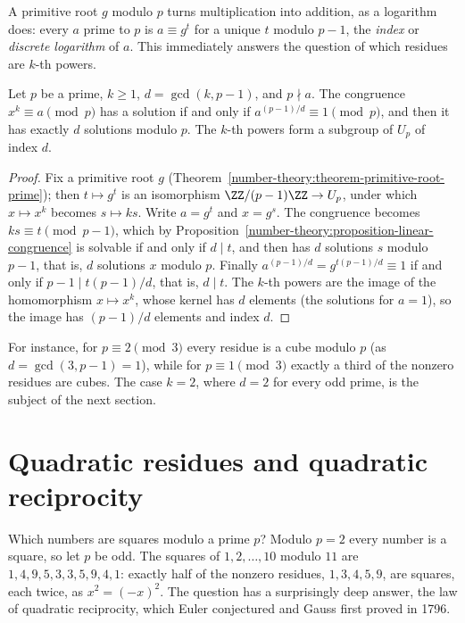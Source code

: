 A primitive root $g$ modulo $p$ turns multiplication into addition, as a logarithm does: every $a$ prime to $p$ is $a \equiv g^t$ for a unique $t$ modulo $p - 1$, the \emph{index} or \emph{discrete
logarithm} of $a$. This immediately answers the question of which residues are $k$-th powers.

\begin{proposition}\label{number-theory:proposition-power-residues}
Let $p$ be a prime, $k \geq 1$, $d = \gcd(k, p - 1)$, and $p \nmid a$. The congruence $x^k \equiv a \pmod p$ has a solution if and only if $a^{(p-1)/d} \equiv 1 \pmod p$, and then it has exactly $d$ solutions
modulo $p$. The $k$-th powers form a subgroup of $U_p$ of index $d$.
\end{proposition}

\begin{proof}
Fix a primitive root $g$ (Theorem~\ref{number-theory:theorem-primitive-root-prime}); then $t \mapsto g^t$ is an isomorphism $\ZZ/(p - 1)\ZZ \to U_p$, under which $x \mapsto x^k$ becomes
$s \mapsto ks$. Write $a = g^t$ and $x = g^s$. The congruence becomes $ks \equiv t \pmod{p - 1}$, which by Proposition~\ref{number-theory:proposition-linear-congruence} is solvable if and only if $d \mid t$,
and then has $d$ solutions $s$ modulo $p - 1$, that is, $d$ solutions $x$ modulo $p$. Finally $a^{(p-1)/d} = g^{t(p-1)/d} \equiv 1$ if and only if $p - 1 \mid t(p - 1)/d$, that is, $d \mid t$. The $k$-th
powers are the image of the homomorphism $x \mapsto x^k$, whose kernel has $d$ elements (the solutions for $a = 1$), so the image has $(p - 1)/d$ elements and index $d$.
\end{proof}

For instance, for $p \equiv 2 \pmod 3$ every residue is a cube modulo $p$ (as $d = \gcd(3, p - 1) = 1$), while for $p \equiv 1 \pmod 3$ exactly a third of the nonzero residues are cubes. The case $k = 2$,
where $d = 2$ for every odd prime, is the subject of the next section.

\section{Quadratic residues and quadratic reciprocity}\label{number-theory:section-quadratic}

Which numbers are squares modulo a prime $p$? Modulo $p = 2$ every number is a square, so let $p$ be odd. The squares of $1, 2, \ldots, 10$ modulo $11$ are $1, 4, 9, 5, 3, 3, 5, 9, 4, 1$: exactly half of the
nonzero residues, $1, 3, 4, 5, 9$, are squares, each twice, as $x^2 = (-x)^2$. The question has a surprisingly deep answer, the law of quadratic reciprocity, which Euler conjectured and Gauss first proved
in 1796.

